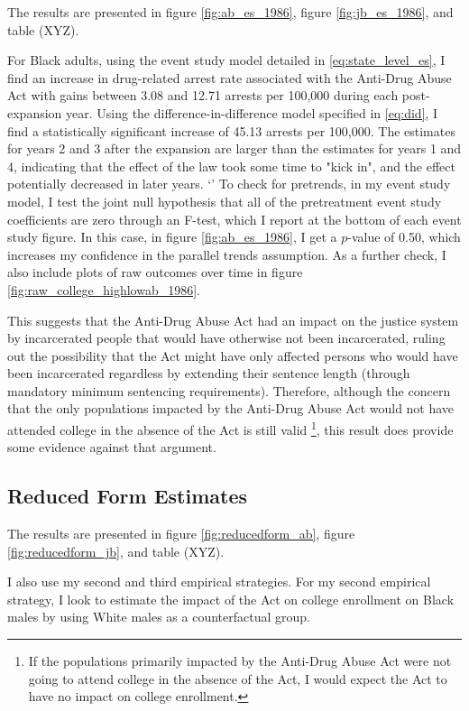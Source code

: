 \documentclass{article}
\begin{document}
The results are presented in figure \ref{fig:ab_es_1986}, figure \ref{fig:jb_es_1986}, and table (XYZ). 

For Black adults, using the event study model detailed in \ref{eq:state_level_es}, I find an increase in drug-related arrest rate associated with the Anti-Drug Abuse Act with gains between 3.08 and 12.71 arrests per 100,000 during each post-expansion year. Using the difference-in-difference model specified in \ref{eq:did}, I find a statistically significant increase of 45.13 arrests per 100,000. The estimates for years 2 and 3 after the expansion are larger than the estimates for years 1 and 4, indicating that the effect of the law took some time to "kick in", and the effect potentially decreased in later years.
`'
To check for pretrends, in my event study model, I test the joint null hypothesis that all of the pretreatment event study coefficients are zero through an F-test, which I report at the bottom of each event study figure. In this case, in figure \ref{fig:ab_es_1986}, I get a $p$-value of 0.50, which increases my confidence in the parallel trends assumption. As a further check, I also include plots of raw outcomes over time in figure  \ref{fig:raw_college_highlowab_1986}.

This suggests that the Anti-Drug Abuse Act had an impact on the justice system by incarcerated people that would have otherwise not been incarcerated, ruling out the possibility that the Act might have only affected persons who would have been incarcerated regardless by extending their sentence length (through mandatory minimum sentencing requirements). Therefore, although the concern that the only populations impacted by the Anti-Drug Abuse Act would not have attended college in the absence of the Act is still valid \footnote{If the populations primarily impacted by the Anti-Drug Abuse Act were not going to attend college in the absence of the Act, I would expect the Act to have no impact on college enrollment.}, this result does provide some evidence against that argument.

\subsection{Reduced Form Estimates}

The results are presented in figure \ref{fig:reducedform_ab}, figure \ref{fig:reducedform_jb}, and table (XYZ). 

I also use my second and third empirical strategies. For my second empirical strategy, I look to estimate the impact of the Act on college enrollment on Black males by using White males as a counterfactual group.
\end{document}
